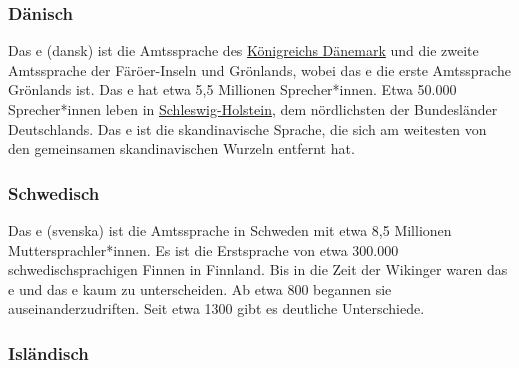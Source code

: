 \subsubsection{Dänisch}

Das e (dansk) ist die Amtssprache des
\href{https://en.wikipedia.org/wiki/Denmark}{Königreichs Dänemark} und die zweite Amtssprache der
Färöer-Inseln und Grönlands, wobei das e die erste Amtssprache
Grönlands ist. Das e hat etwa 5,5 Millionen Sprecher*innen. Etwa 50.000 Sprecher*innen leben in \href{https://en.wikipedia.org/wiki/Schleswig-Holstein}{Schleswig-Holstein}, dem nördlichsten der Bundesländer Deutschlands.
Das e ist die skandinavische Sprache, die sich am weitesten von den gemeinsamen skandinavischen Wurzeln entfernt hat.


\subsubsection{Schwedisch}

Das e (svenska) ist die Amtssprache in Schweden mit etwa 8,5 Millionen Muttersprachler*innen. Es ist
die Erstsprache von etwa 300.000 schwedischsprachigen Finnen in Finnland. Bis in die Zeit der
Wikinger waren das e und das e kaum zu unterscheiden. Ab etwa 800 begannen sie
auseinanderzudriften. Seit etwa 1300 gibt es deutliche Unterschiede.



\subsubsection{Isländisch}


